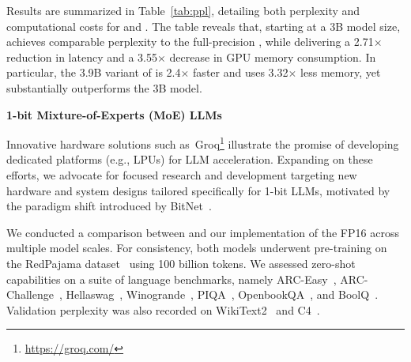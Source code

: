Results are summarized in Table~\ref{tab:ppl}, detailing both perplexity and computational costs for  and . The table reveals that, starting at a 3B model size,  achieves comparable perplexity to the full-precision , while delivering a 2.71$\times$ reduction in latency and a 3.55$\times$ decrease in GPU memory consumption. In particular, the 3.9B variant of  is 2.4$\times$ faster and uses 3.32$\times$ less memory, yet substantially outperforms the  3B model.

\textbf{1-bit Mixture-of-Experts (MoE) LLMs}

Innovative hardware solutions such as~Groq\footnote{\url{https://groq.com/}} illustrate the promise of developing dedicated platforms (e.g., LPUs) for LLM acceleration. Expanding on these efforts, we advocate for focused research and development targeting new hardware and system designs tailored specifically for 1-bit LLMs, motivated by the paradigm shift introduced by BitNet~\cite{bitnet}.


\begin{abstract}
Emerging work, exemplified by BitNet~\cite{bitnet}, heralds the advent of 1-bit Large Language Models (LLMs). Here, we propose a new 1-bit LLM variant, \textbf{}, whose parameters are exclusively drawn from the ternary set \{-1, 0, 1\}. Remarkably, this approach achieves parity with full-precision Transformer LLMs (FP16 or BF16) of equivalent architecture and training scale, both in perplexity and downstream task efficacy. Moreover, this model offers substantial improvements in latency, memory usage, throughput, and energy efficiency. Beyond its efficiency gains, the 1.58-bit LLM introduces a novel scaling law and establishes a new methodology for training future LLMs that are simultaneously performant and resource-friendly. This innovation not only fosters a shift in computational paradigms but also creates new opportunities for hardware explicitly optimized for 1-bit LLMs.
\end{abstract}

We conducted a comparison between  and our implementation of the FP16  across multiple model scales. For consistency, both models underwent pre-training on the RedPajama dataset~\cite{redpajama} using 100 billion tokens. We assessed zero-shot capabilities on a suite of language benchmarks, namely ARC-Easy~\cite{arc}, ARC-Challenge~\cite{arc}, Hellaswag~\cite{hellaswag}, Winogrande~\cite{winoGrande}, PIQA~\cite{piqa}, OpenbookQA~\cite{openbookqa}, and BoolQ~\cite{boolq}. Validation perplexity was also recorded on WikiText2~\cite{wikitext2} and C4~\cite{c4}.